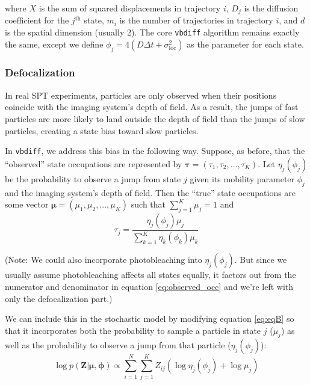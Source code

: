 \documentclass{article}
\let\vec\boldsymbol
\begin{document}
where $X$ is the sum of squared displacements in trajectory $i$,
$D_{j}$ is the diffusion coefficient for the $j^{\text{th}}$ state,
$m_{i}$ is the number of trajectories in trajectory $i$, and $d$
is the spatial dimension (usually 2). The core \verb|vbdiff| algorithm
remains exactly the same, except we define
$\phi_{j} = 4 (D \Delta t + \sigma_{\text{loc}}^{2})$ as the parameter
for each state.

\subsubsection{Defocalization}

In real SPT experiments, particles are only observed when their
positions coincide with the imaging system's depth of field.
As a result, the jumps of fast particles are more likely to land outside
the depth of field than the jumps of slow particles, creating a state
bias toward slow particles. \newline

In \verb|vbdiff|, we address this bias in the following way.
Suppose, as before, that the ``observed'' state occupations
are represented by $\boldsymbol{\tau} = (\tau_{1}, \tau_{2}, ..., \tau_{K})$.
Let $\eta_{j}(\phi_{j})$ be the probability to observe a jump from state $j$ given its mobility parameter $\phi_{j}$ and the imaging system's depth of field.
Then the ``true'' state occupations are some vector
$\boldsymbol{\mu} = (\mu_{1}, \mu_{2}, ..., \mu_{K})$ such that
$\sum_{j=1}^{K} \mu_{j} = 1$ and
\begin{equation}\label{eq:observed_occ}
    \tau_{j} = \frac{ \eta_{j} (\phi_{j}) \mu_{j} }{ \sum\limits_{k=1}^{K} \eta_{k} (\phi_{k}) \mu_{k} }
\end{equation}

(Note: We could also incorporate photobleaching into $\eta_{j} (\phi_{j})$. But
since we usually assume photobleaching affects all states equally,
it factors out from the numerator and denominator in equation
\ref{eq:observed_occ} and we're left with only the defocalization part.) \newline

We can include this in the stochastic model by modifying
equation \ref{eq:eqB} so that it incorporates both the
probability to sample a particle in state $j$ ($\mu_{j}$)
as well as the probability to observe a jump from that
particle ($\eta_{j}(\phi_{j})$):
\[
    \log p \left( \vec{Z} | \boldsymbol{\mu}, \boldsymbol{\phi} \right) \propto \sum\limits_{i=1}^{N} \sum\limits_{j=1}^{K} Z_{ij} \left(
        \log \eta_{j} (\phi_{j}) + \log \mu_{j}
    \right)
\]
\end{document}
